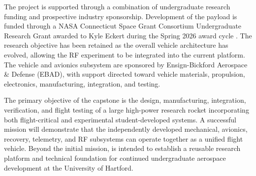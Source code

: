 The project is supported through a combination of undergraduate research funding and prospective industry sponsorship. Development of the \phobos{} payload is funded through a NASA Connecticut Space Grant Consortium Undergraduate Research Grant awarded to Kyle Eckert during the Spring 2026 award cycle \cite{ctsgc2026}. The research objective has been retained as the overall vehicle architecture has evolved, allowing the RF experiment to be integrated into the current \ares{} platform. The \ares{} vehicle and \deimos{} avionics subsystem are sponsored by Ensign-Bickford Aerospace \& Defense (EBAD), with support directed toward vehicle materials, propulsion, electronics, manufacturing, integration, and testing.

The primary objective of the capstone is the design, manufacturing, integration, verification, and flight testing of a large high-power research rocket incorporating both flight-critical and experimental student-developed systems. 
A successful mission will demonstrate that the independently developed mechanical, avionics, recovery, telemetry, and RF subsystems can operate together as a unified flight vehicle. 
Beyond the initial mission, \ares{} is intended to establish a reusable research platform and technical foundation for continued undergraduate aerospace development at the University of Hartford.